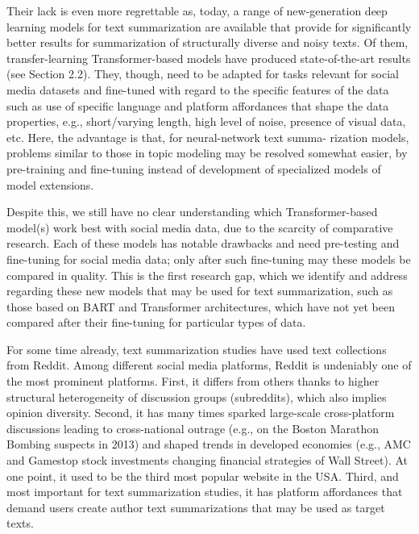 Their lack is even more regrettable as, today, a range of new-generation deep learning models for text summarization are available that provide for significantly better results for summarization of structurally diverse and noisy texts. Of them, transfer-learning Transformer-based models have produced state-of-the-art results (see Section 2.2). They, though, need to be adapted for tasks relevant for social media datasets and fine-tuned with regard to the specific features of the data such as use of specific language and platform affordances that shape the data properties, e.g., short/varying length, high level of noise, presence of visual data, etc. Here, the advantage is that, for neural-network text summa- rization models, problems similar to those in topic modeling may be resolved somewhat easier, by pre-training and fine-tuning instead of development of specialized models of model extensions.

Despite this, we still have no clear understanding which Transformer-based model(s) work best with social media data, due to the scarcity of comparative research. Each of these models has notable drawbacks and need pre-testing and fine-tuning for social media data; only after such fine-tuning may these models be compared in quality. This is the first research gap, which we identify and address regarding these new models that may be used for text summarization, such as those based on BART and Transformer architectures, which have not yet been compared after their fine-tuning for particular types of data.

For some time already, text summarization studies have used text collections from Reddit. Among different social media platforms, Reddit is undeniably one of the most prominent platforms. First, it differs from others thanks to higher structural heterogeneity of discussion groups (subreddits), which also implies opinion diversity. Second, it has many times sparked large-scale cross-platform discussions leading to cross-national outrage (e.g., on the Boston Marathon Bombing suspects in 2013) and shaped trends in developed economies (e.g., AMC and Gamestop stock investments changing financial strategies of Wall Street). At one point, it used to be the third most popular website in the USA. Third, and most important for text summarization studies, it has platform affordances that demand users create author text summarizations that may be used as target texts.

